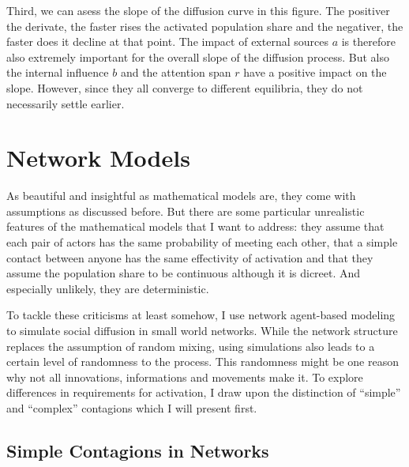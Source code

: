 \documentclass[a4paper,12pt]{article}
\begin{document}
Third, we can asess the slope of the diffusion curve in this figure. The positiver the derivate, the faster rises the activated population share and the negativer, the faster does it decline at that point. The impact of external sources $a$ is therefore also extremely important for the overall slope of the diffusion process. But also the internal influence $b$ and the attention span $r$ have a positive impact on the slope. However, since they all converge to different equilibria, they do not necessarily settle earlier.

\section{Network Models}

As beautiful and insightful as mathematical models are, they come with assumptions as discussed before. But there are some particular unrealistic features of the mathematical models that I want to address: they assume that each pair of actors has the same probability of meeting each other, that a simple contact between anyone has the same effectivity of activation and that they assume the population share to be continuous although it is dicreet. And especially unlikely, they are deterministic. 

To tackle these criticisms at least somehow, I use network agent-based modeling to simulate social diffusion in small world networks. While the network structure replaces the assumption of random mixing, using simulations also leads to a certain level of randomness to the process. This randomness might be one reason why not all innovations, informations and movements make it. To explore differences in requirements for activation, I draw upon the distinction of ``simple'' and ``complex'' contagions which I will present first.

\subsection{Simple Contagions in Networks}
\end{document}
